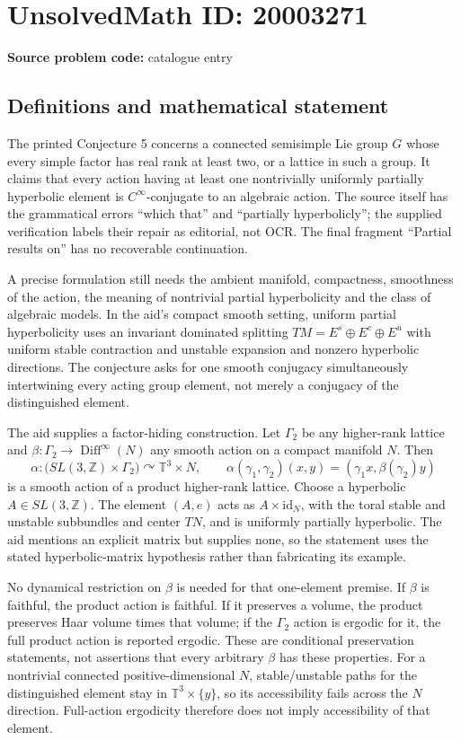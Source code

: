 \documentclass[11pt]{article}
\newcommand{\Z}{\mathbb{Z}}
\begin{document}
\section*{UnsolvedMath ID: 20003271}
\textbf{Source problem code:} catalogue entry
\subsection{Definitions and mathematical statement}
The printed Conjecture 5 concerns a connected semisimple Lie group $G$ whose every simple factor has real rank at least two, or a lattice in such a group. It claims that every action having at least one nontrivially uniformly partially hyperbolic element is $C^\infty$-conjugate to an algebraic action. The source itself has the grammatical errors ``which that'' and ``partially hyperbolicly''; the supplied verification labels their repair as editorial, not OCR. The final fragment ``Partial results on'' has no recoverable continuation.

A precise formulation still needs the ambient manifold, compactness, smoothness of the action, the meaning of nontrivial partial hyperbolicity and the class of algebraic models. In the aid's compact smooth setting, uniform partial hyperbolicity uses an invariant dominated splitting $TM=E^s\oplus E^c\oplus E^u$ with uniform stable contraction and unstable expansion and nonzero hyperbolic directions. The conjecture asks for one smooth conjugacy simultaneously intertwining every acting group element, not merely a conjugacy of the distinguished element.

The aid supplies a factor-hiding construction. Let $\Gamma_2$ be any higher-rank lattice and $\beta:\Gamma_2\to\operatorname{Diff}^\infty(N)$ any smooth action on a compact manifold $N$. Then
\[
 \alpha:\bigl(SL(3,\Z)\times\Gamma_2\bigr)\curvearrowright\mathbb T^3\times N,
 \qquad
 \alpha(\gamma_1,\gamma_2)(x,y)=(\gamma_1x,\beta(\gamma_2)y)
\]
is a smooth action of a product higher-rank lattice. Choose a hyperbolic $A\in SL(3,\Z)$. The element $(A,e)$ acts as $A\times\mathrm{id}_N$, with the toral stable and unstable subbundles and center $TN$, and is uniformly partially hyperbolic. The aid mentions an explicit matrix but supplies none, so the statement uses the stated hyperbolic-matrix hypothesis rather than fabricating its example.

No dynamical restriction on $\beta$ is needed for that one-element premise. If $\beta$ is faithful, the product action is faithful. If it preserves a volume, the product preserves Haar volume times that volume; if the $\Gamma_2$ action is ergodic for it, the full product action is reported ergodic. These are conditional preservation statements, not assertions that every arbitrary $\beta$ has these properties. For a nontrivial connected positive-dimensional $N$, stable/unstable paths for the distinguished element stay in $\mathbb T^3\times\{y\}$, so its accessibility fails across the $N$ direction. Full-action ergodicity therefore does not imply accessibility of that element.
\end{document}
